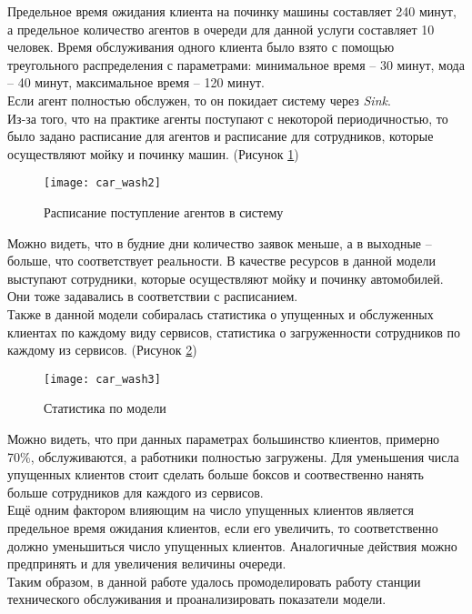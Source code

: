 Предельное время ожидания клиента на починку машины составляет 240 минут, а предельное количество агентов в очереди для данной услуги составляет 10 человек. Время обслуживания одного клиента было взято с помощью треугольного распределения с параметрами: минимальное время -- 30 минут, мода -- 40 минут, максимальное время -- 120 минут.\\

Если агент полностью обслужен, то он покидает систему через \textit{Sink}.\\

Из-за того, что на практике агенты поступают с некоторой периодичностью, то было задано расписание для агентов и расписание для сотрудников, которые осуществляют мойку и починку машин. (Рисунок \ref{fig:car_wash2})
\begin{figure}[h]
	\centering \texttt{[image: car\_wash2]}
	\caption{Расписание поступление агентов в систему}
	\label{fig:car_wash2}
\end{figure}

Можно видеть, что в будние дни количество заявок меньше, а в выходные -- больше, что соответствует реальности. В качестве ресурсов в данной модели выступают сотрудники, которые осуществляют мойку и починку автомобилей. Они тоже задавались в соответствии с расписанием.\\

Также в данной модели собиралась статистика о упущенных и обслуженных клиентах по каждому виду сервисов, статистика о загруженности сотрудников по каждому из сервисов. (Рисунок \ref{fig:car_wash3})
\begin{figure}[h]
	\centering \texttt{[image: car\_wash3]}
	\caption{Статистика по модели}
	\label{fig:car_wash3}
\end{figure}

Можно видеть, что при данных параметрах большинство клиентов, примерно 70\%, обслуживаются, а работники полностью загружены. Для уменьшения числа упущенных клиентов стоит сделать больше боксов и соотвественно нанять больше сотрудников для каждого из сервисов.\\

Ещё одним фактором влияющим на число упущенных клиентов является предельное время ожидания клиентов, если его увеличить, то соответственно должно уменьшиться число упущенных клиентов. Аналогичные действия можно предпринять и для увеличения величины очереди.\\

Таким образом, в данной работе удалось промоделировать работу станции технического обслуживания и проанализировать показатели модели.\\